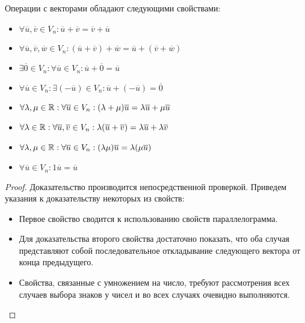     \begin{proposition}
    	Операции с векторами обладают следующими свойствами:
    	\begin{itemize}
    		\item $\forall \overline{u}, \overline{v} \in V_n: \overline{u} + \overline{v} = \overline{v} + \overline{u}$
    		\item $\forall \overline{u}, \overline{v}, \overline{w} \in V_n: (\overline{u} + \overline{v}) + \overline{w} = \overline{u} + (\overline{v} + \overline{w})$
    		\item $\exists \overline{0} \in V_n: \forall \overline{u} \in V_n: \overline{u} + \overline{0} = \overline{u}$
    		\item $\forall \overline{u} \in V_n: \exists (-\overline{u}) \in V_n:  \overline{u} + (-\overline{u}) = \overline{0}$
    		\item $\forall \lambda, \mu \in \mathbb{R}: \forall \overline{u} \in V_n: (\lambda + \mu)\overline{u} = \lambda \overline{u} + \mu \overline{u}$
    		\item $\forall \lambda \in \mathbb{R}:  \forall \overline{u}, \overline{v} \in V_n: \lambda(\overline{u} + \overline{v}) = \lambda \overline{u} + \lambda \overline{v}$
    		\item $\forall \lambda, \mu \in \mathbb{R}:  \forall \overline{u} \in V_n: (\lambda \mu)\overline{u} = \lambda(\mu \overline{u})$
    		\item $\forall \overline{u} \in V_n: 1\overline{u} = \overline{u}$
    	\end{itemize}
    \end{proposition}
    
    \begin{proof}
    	Доказательство производится непосредственной проверкой. Приведем указания к доказательству некоторых из свойств:
    	\begin{itemize}
    		\item Первое свойство сводится к использованию свойств параллелограмма.
    		\item Для доказательства второго свойства достаточно показать, что оба случая представляют собой последовательное откладывание следующего вектора от конца предыдущего.
    		\item Свойства, связанные с умножением на число, требуют рассмотрения всех случаев выбора знаков у чисел и во всех случаях очевидно выполняются.\qedhere
    	\end{itemize}
    \end{proof}
    
